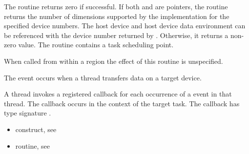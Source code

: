 \begin{ccppspecific}
The routine returns zero if successful. If both  and  are
 pointers, the routine returns the number of dimensions supported
by the implementation for the specified device numbers. The host device and
host device data environment can be referenced with the device number returned
by .  Otherwise, it returns a non-zero value. The
routine contains a task scheduling point.

When called from within a  region 
the effect of this routine is unspecified.


\begin{figure}[t!]
\end{figure}

\events
The  event occurs when a thread transfers data on a target device.

\tools

A thread invokes a registered 
callback for each occurrence of a  event in that thread. 
The callback occurs in the context of the target task.  The callback has type signature
. 


\crossreferences
\begin{itemize}
\item {} construct, see 

\item {} routine, see 


\end{itemize}
\end{ccppspecific}
